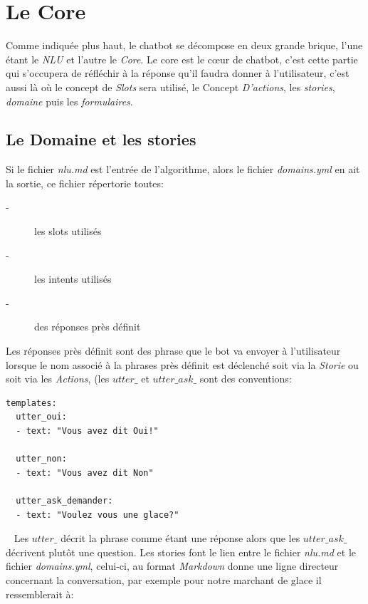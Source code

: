 \chapter{Le Core}

Comme indiquée plus haut, le chatbot se décompose en deux grande brique, l'une étant le \textit{NLU} et l'autre le \textit{Core}. Le core est le cœur de chatbot, c'est cette partie qui s'occupera de réfléchir à la réponse qu'il faudra donner à l'utilisateur, c'est aussi là où le concept de \textit{Slots} sera utilisé, le Concept \textit{D'actions}, les \textit{stories}, \textit{domaine} puis les \textit{formulaires}.\\
\pagebreak

\section{Le Domaine et les stories}
Si le fichier \textit{nlu.md} est l'entrée de l'algorithme, alors le fichier \textit{domains.yml} en ait la sortie, ce fichier répertorie toutes:

\begin{description}
\item[-] les slots utilisés
\item[-] les intents utilisés
\item[-] des réponses près définit 
\end{description}

Les réponses près définit sont des phrase que le bot va envoyer à l'utilisateur lorsque le nom associé à la phrases près définit est déclenché soit via la \textit{Storie} ou soit via les \textit{Actions}, (les \textit{$utter\_$} et \textit{$utter\_ask\_$} sont des conventions:

\begin{lstlisting}
templates:
  utter_oui:
  - text: "Vous avez dit Oui!"

  utter_non:
  - text: "Vous avez dit Non"
  
  utter_ask_demander:
  - text: "Voulez vous une glace?"
\end{lstlisting}
\ \linebreak
Les \textit{$utter\_$} décrit la phrase comme étant une réponse alors que les \textit{$utter\_ask\_$} décrivent plutôt une question.
Les stories font le lien entre le fichier \textit{nlu.md} et le fichier \textit{domains.yml}, celui-ci, au format \textit{Markdown} donne une ligne directeur concernant la conversation, par exemple pour notre marchant de glace il ressemblerait à:

